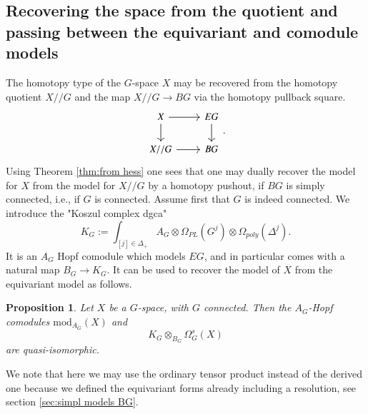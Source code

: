 \documentclass[a4paper]{amsart}
\theoremstyle{plain}
\newtheorem{prop}[thm]{Proposition}
\theoremstyle{definition}
\renewcommand{\mod}{\mathrm{mod}}
\begin{document}
\subsection{Recovering the space from the quotient and passing between the equivariant and comodule models}\label{sec:space from quotient}
The homotopy type of the $G$-space $X$ may be recovered from the homotopy quotient $X//G$ and the map $X//G\to BG$ via the homotopy pullback square.
\[
 \begin{tikzcd}
  X \ar{d} \ar{r} & EG \ar{d}\\
  X//G  \ar{r} & BG 
 \end{tikzcd}.
\]
Using Theorem \ref{thm:from hess} one sees that one may dually recover the model for $X$ from the model for $X//G$ by a homotopy pushout, if $BG$ is simply connected, i.e., if $G$ is connected.
Assume first that $G$ is indeed connected.
We introduce the "Koszul complex dgca"
\[
K_G:=  \int_{[j]\in \Delta_+} A_G \otimes \Omega_{PL}(G^j) \otimes \Omega_{poly}(\Delta^j).
\]
It is an $A_G$ Hopf comodule which models $EG$, and in particular comes with a natural map $B_G\to K_G$. It can be used to recover the model of $X$ from the equivariant model as follows.
\begin{prop}\label{prop:space from quotient}
Let $X$ be a $G$-space, with $G$ connected. Then the $A_G$-Hopf comodules $\mod_{A_G}(X)$ and 
\[
K_G \otimes_{B_G} \Omega_G^s(X)
\]  
are quasi-isomorphic.
\end{prop}
We note that here we may use the ordinary tensor product instead of the derived one because we defined the equivariant forms already including a resolution, see section \ref{sec:simpl models BG}.
\end{document}
